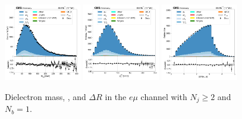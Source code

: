 \begin{figure}[htb!]
    \centering
    \includegraphics[width=0.3\textwidth]{chapters/Analysis/sectionPlots/figures/data_mc_overlays/emu_2016_cat_gt2_gt2_a_signal_linear_lepton_dilepton1_mass}
    \includegraphics[width=0.3\textwidth]{chapters/Analysis/sectionPlots/figures/data_mc_overlays/emu_2016_cat_gt2_gt2_a_signal_linear_lepton_dilepton1_pt}
    \includegraphics[width=0.3\textwidth]{chapters/Analysis/sectionPlots/figures/data_mc_overlays/emu_2016_cat_gt2_gt2_a_signal_linear_lepton_dilepton1_delta_r}
    \caption{Dielectron mass, \pt, and $\Delta R$ in the $e\mu$ channel
    with $N_{j} \geq 2$ and $N_{b} = 1$.}
    \label{fig:analysis:plots:emu_6_dilepton}
\end{figure}


